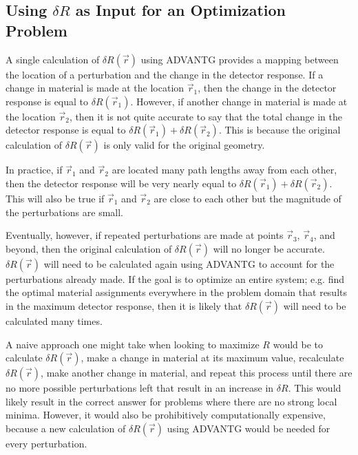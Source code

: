 \subsection{Using $\delta R$ as Input for an Optimization Problem}
\label{sec:proposal:nuclear_optimization}

A single calculation of $\delta R\left(\vec{r}\right)$ using ADVANTG provides a mapping between the location of a perturbation and the change in the detector response.
If a change in material is made at the location $\vec{r}_1$, then the change in the detector response is equal to $\delta R\left(\vec{r}_1\right)$.
However, if another change in material is made at the location $\vec{r}_2$, then it is not quite accurate to say that the total change in the detector response is equal to $\delta R\left(\vec{r}_1\right) + \delta R\left(\vec{r}_2\right)$.
This is because the original calculation of $\delta R\left(\vec{r}\right)$ is only valid for the original geometry.

In practice, if $\vec{r}_1$ and $\vec{r}_2$ are located many path lengths away from each other, then the detector response will be very nearly equal to $\delta R\left(\vec{r}_1\right) + \delta R\left(\vec{r}_2\right)$.
This will also be true if $\vec{r}_1$ and $\vec{r}_2$ are close to each other but the magnitude of the perturbations are small.

Eventually, however, if repeated perturbations are made at points $\vec{r}_3$, $\vec{r}_4$, and beyond, then the original calculation of $\delta R\left(\vec{r}\right)$ will no longer be accurate.
$\delta R\left(\vec{r}\right)$ will need to be calculated again using ADVANTG to account for the perturbations already made.
If the goal is to optimize an entire system; e.g. find the optimal material assignments everywhere in the problem domain that results in the maximum detector response, then it is likely that $\delta R\left(\vec{r}\right)$ will need to be calculated many times.

A naive approach one might take when looking to maximize $R$ would be to calculate $\delta R\left(\vec{r}\right)$, make a change in material at its maximum value, recalculate $\delta R\left(\vec{r}\right)$, make another change in material, and repeat this process until there are no more possible perturbations left that result in an increase in $\delta R$.
This would likely result in the correct answer for problems where there are no strong local minima.
However, it would also be prohibitively computationally expensive, because a new calculation of $\delta R\left(\vec{r}\right)$ using ADVANTG would be needed for every perturbation.

